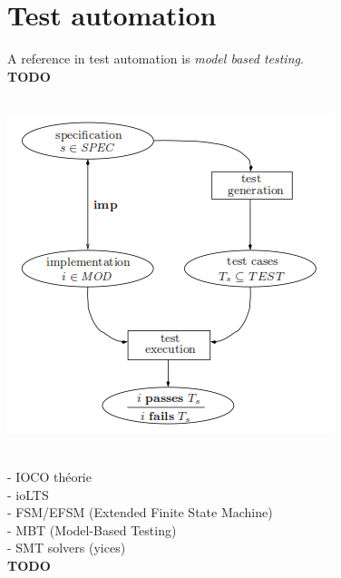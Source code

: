 \documentclass[a4paper]{report}
\begin{document}
\section*{Test automation}
A reference in test automation is \textit{model based testing}.\\
{\color{red} \textbf{TODO}}\\
\newline
$ $\\
\centerline{
  \includegraphics[scale=0.5]{img/modelBasedTesting.png}
}
$ $\\
\newline
- IOCO théorie\\
- ioLTS\\
- FSM/EFSM (Extended Finite State Machine)\\
- MBT (Model-Based Testing)\\
- SMT solvers (yices)\\
{\color{red} \textbf{TODO}}\\
\end{document}
